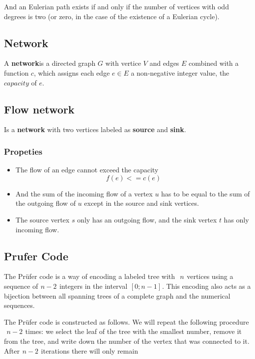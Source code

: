 And an Eulerian path exists if and only if the number of vertices with odd degrees is two (or zero, in the case of the existence of a Eulerian cycle).

\subsection{Network}

A \textbf{network}is a directed graph $G$ with vertice $V$ and edges $E$ combined with a function $c$, which assigns each edge $e \in E$ a non-negative integer value, the $capacity$ of $e$. 

\subsection{Flow network}

Is a \textbf{network} with two vertices labeled as \textbf{source} and \textbf{sink}.

\subsubsection{Propeties}
\begin{itemize}
    \item The flow of an edge cannot exceed the capacity $$ f(e) <= c(e) $$
    \item And the sum of the incoming flow of a vertex $u$ has to be equal to the sum of the outgoing flow of $u$ except in the source and sink vertices.
    \item The source vertex $s$ only has an outgoing flow, and the sink vertex $t$ has only incoming flow.
\end{itemize}

\subsection{Prufer Code}

The Prüfer code is a way of encoding a labeled tree with  
$n$  vertices using a sequence of  $n - 2$  integers in the interval  $[0; n-1]$ . This encoding also acts as a bijection between all spanning trees of a complete graph and the numerical sequences.



The Prüfer code is constructed as follows. We will repeat the following procedure  
$n - 2$  times: we select the leaf of the tree with the smallest number, remove it from the tree, and write down the number of the vertex that was connected to it. After  $n - 2$  iterations there will only remain  

